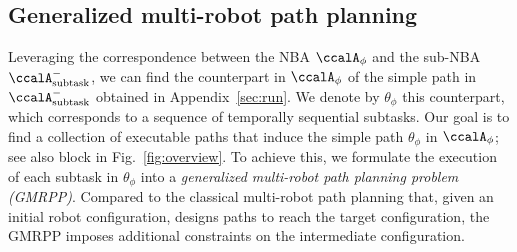 \documentclass[Afour,sageh,times]{sagej}
\newcommand*\circled[1]{\tikz[baseline=(char.base)]{
            \node[shape=circle,draw,inner sep=1pt] (char) {#1};}}
\newcommand{\auto}[1]{\ccalA_{\textup{#1}}}
\newcommand{\autop}{\ccalA_{\phi}}
\newcommand{\node}[1]{V_{n}^{\text{#1}}}
\begin{document}
{ {\subsection{Generalized multi-robot path planning}\label{sec:mapp}
Leveraging the correspondence between the NBA  $\autop$ and the sub-NBA $\auto{subtask}^-$,  we can find the counterpart in $\autop$ of the simple path in $\auto{subtask}^-$ obtained in Appendix~\ref{sec:run}. We denote by $\theta_{\phi}$ this counterpart, which corresponds to a sequence of temporally sequential subtasks. Our goal is to find a collection of executable paths  that induce the simple path $\theta_{\phi}$ in $\autop$; see also block \circled{7} in Fig.~\ref{fig:overview}. To achieve this, we formulate the execution of each subtask in $\theta_{\phi}$ into a {\it generalized multi-robot path planning problem (GMRPP)}. Compared to the classical multi-robot path planning that, given an initial robot configuration, designs paths to reach the target configuration, the GMRPP imposes additional constraints on the intermediate configuration.



}}
\end{document}

